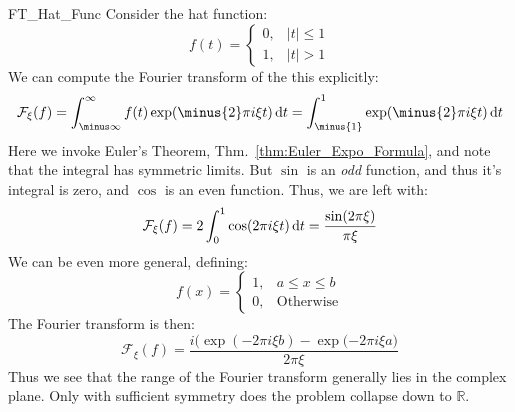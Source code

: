         \begin{lexample}{}{FT_Hat_Func}
            Consider the hat function:
            \begin{equation}
                f(t)=
                \begin{cases}
                    0,&|t|\leq{1}\\
                    1,&|t|>1
                \end{cases}
            \end{equation}
            We can compute the Fourier transform of the this
            explicitly:
            \begin{equation}
                \mathcal{F}_{\xi}(f)
                =\int_{\minus\infty}^{\infty}f(t)
                    \exp(\minus{2}\pi{i}\xi{t})\diff{t}
                =\int_{\minus{1}}^{1}
                    \exp(\minus{2}\pi{i}\xi{t})\diff{t}
            \end{equation}
            Here we invoke Euler's Theorem,
            Thm.~\ref{thm:Euler_Expo_Formula},
            and note that the integral has symmetric limits.
            But $\sin$ is an \textit{odd} function, and thus
            it's integral is zero, and $\cos$ is an even
            function. Thus, we are left with:
            \begin{equation}
                \mathcal{F}_{\xi}(f)=
                2\int_{0}^{1}\cos(2\pi{i}\xi{t})\mathop{}\!\mathrm{d}{t}
                =\frac{\sin(2\pi\xi)}{\pi\xi}
            \end{equation}
            We can be even more general, defining:
            \begin{equation}
                f(x)=
                \begin{cases}
                    1,&a\leq{x}\leq{b}\\
                    0,&\textrm{Otherwise}
                \end{cases}
            \end{equation}
            The Fourier transform is then:
            \begin{equation}
                \mathcal{F}_{\xi}(f)=
                \frac{i\big(\exp(\minus{2}\pi{i}\xi{b})-
                        \exp(\minus{2}\pi{i}\xi{a}\big)}{2\pi\xi}
            \end{equation}
            Thus we see that the range of the Fourier transform
            generally lies in the complex plane. Only with
            sufficient symmetry does the problem collapse down
            to $\mathbb{R}$.
        \end{lexample}
